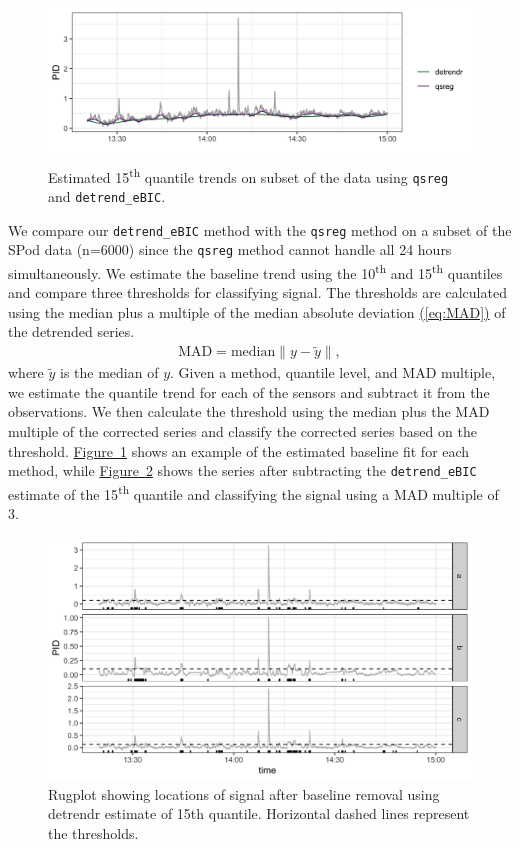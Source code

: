 \documentclass[12pt]{article}
\newcommand{\Eqn}[1]{\hyperref[eq:#1]{{\rm (\ref*{eq:#1})}}} %
\newcommand{\Fig}[1]{\hyperref[fig:#1]{Figure~\ref*{fig:#1}}} %
\newcommand{\Eqn}[1]{{(\ref{eq:#1})}} %
\newcommand{\Fig}[1]{{Figure~\ref{fig:#1}}} %
\begin{document}
	\begin{figure}
		\includegraphics[width = \linewidth]{Figures/short_trends.png}
		\caption{Estimated 15\textsuperscript{th} quantile trends on subset of the data using \texttt{qsreg} and \texttt{detrend\_eBIC}.}
		\label{fig:short-trends}
	\end{figure}

	We compare our \texttt{detrend\_eBIC} method with the \texttt{qsreg} method on a subset of the SPod data (n=6000) since the \texttt{qsreg} method cannot handle all 24 hours simultaneously. We estimate the baseline trend using the 10\textsuperscript{th} and 15\textsuperscript{th} quantiles and compare three thresholds for classifying signal. The thresholds are calculated using the median plus a multiple of the median absolute deviation \Eqn{MAD} of the detrended series.
	\begin{eqnarray}
	\label{eq:MAD}
	\mbox{MAD} = \mbox{median}\lVert y-\tilde{y}\rVert,
	\end{eqnarray}
	where $\tilde{y}$ is the median of $y$. Given a method, quantile level, and MAD multiple, we estimate the quantile trend for each of the sensors and subtract it from the observations. We then calculate the threshold using the median plus the MAD multiple of the corrected series and classify the corrected series based on the threshold. \Fig{short-trends} shows an example of the estimated baseline fit for each method, while \Fig{rugplot} shows the series after subtracting the \texttt{detrend\_eBIC} estimate of the 15\textsuperscript{th} quantile and classifying the signal using a MAD multiple of 3.

 	\begin{figure}
	 	\includegraphics[width = \linewidth]{Figures/corrected_rugplot.png}
	 	\caption{Rugplot showing locations of signal after baseline removal using detrendr estimate of 15th quantile. Horizontal dashed lines represent the thresholds.}
	 	\label{fig:rugplot}
	 \end{figure}
\end{document}
